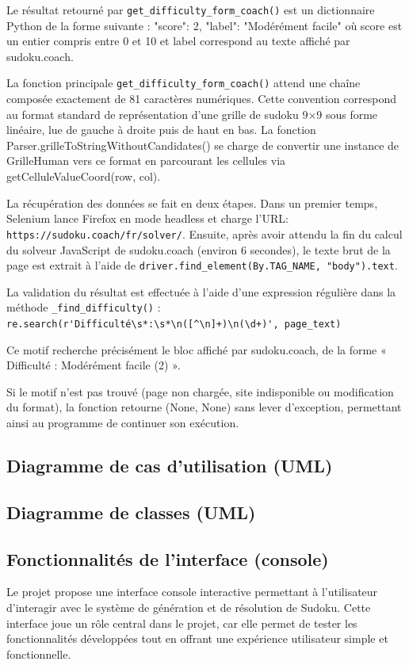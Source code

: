 \documentclass[a4paper]{article}
\begin{document}
Le résultat retourné par \texttt{get\_difficulty\_form\_coach()} est un dictionnaire Python de la forme suivante :
{"score": 2, "label": "Modérément facile"}
où score est un entier compris entre 0 et 10 et label correspond au texte affiché par sudoku.coach.

La fonction principale \texttt{get\_difficulty\_form\_coach()} attend une chaîne composée exactement de 81 caractères numériques. Cette convention correspond au format standard de représentation d’une grille de sudoku 9×9 sous forme linéaire, lue de gauche à droite puis de haut en bas. La fonction Parser.grilleToStringWithoutCandidates() se charge de convertir une instance de GrilleHuman vers ce format en parcourant les cellules via getCelluleValueCoord(row, col).

La récupération des données se fait en deux étapes. Dans un premier temps, Selenium lance Firefox en mode headless et charge l’URL: \texttt{https://sudoku.coach/fr/solver/}. 
Ensuite, après avoir attendu la fin du calcul du solveur JavaScript de sudoku.coach (environ 6 secondes), le texte brut de la page est extrait à l’aide de \texttt{driver.find\_element(By.TAG\_NAME, "body").text}.

La validation du résultat est effectuée à l’aide d’une expression régulière dans la méthode \texttt{\_find\_difficulty()} :
\verb|re.search(r'Difficulté\s*:\s*\n([^\n]+)\n(\d+)', page_text)|

Ce motif recherche précisément le bloc affiché par sudoku.coach, de la forme « Difficulté : Modérément facile (2) ».

Si le motif n’est pas trouvé (page non chargée, site indisponible ou modification du format), la fonction retourne (None, None) sans lever d’exception, permettant ainsi au programme de continuer son exécution.

\subsection{Diagramme de cas d’utilisation (UML)}

\subsection{Diagramme de classes (UML)}

\subsection{Fonctionnalités de l’interface (console)}
Le projet propose une interface console interactive permettant à l’utilisateur d’interagir avec le système de génération et de résolution de Sudoku. Cette interface joue un rôle central dans le projet, car elle permet de tester les fonctionnalités développées tout en offrant une expérience utilisateur simple et fonctionnelle.
\end{document}

